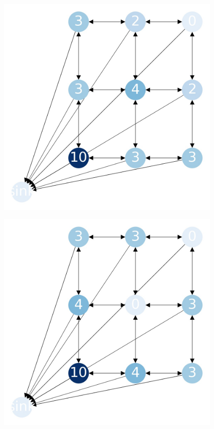 \documentclass{beamer}
\begin{document}
    \begin{frame}
      \begin{figure}[h!]
        \centering
          \includegraphics[scale=0.25]{sandpile_-20}
      \end{figure}
    \end{frame}
    

    \begin{frame}
      \begin{figure}[h!]
        \centering
          \includegraphics[scale=0.25]{sandpile_-21}
      \end{figure}
    \end{frame}
    
\end{document}
